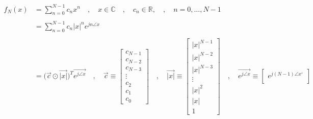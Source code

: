 \documentclass{article}
\begin{document}
\begin{align*}
    f_{N}(x)&= \sum^{N - 1}_{n = 0}c_{n}x^{n} \quad , \quad x \in \mathbb{C} \quad , \quad c_n \in \mathbb{R}, \quad , \quad n = 0, ..., N - 1 \\ \\
            &= \sum^{N - 1}_{n = 0}c_{n}|x|^{n}e^{jn\angle{x}} \\ \\
            &= \Big(\vec{c} \odot \vec{|x|}\Big)^{T}\vec{e^{j\angle{x}}} \quad , \quad
                                     \vec{c} \equiv \begin{bmatrix}
                                                        c_{N - 1} \\
                                                        c_{N - 2} \\
                                                        c_{N - 3} \\
                                                        \vdots \\
                                                        c_{2} \\
                                                        c_{1} \\
                                                        c_{0}
                                                      \end{bmatrix} \quad , \quad
                                   \vec{|x|} \equiv \begin{bmatrix}
                                                        |x|^{N - 1} \\
                                                        |x|^{N - 2} \\
                                                        |x|^{N - 3} \\
                                                        \vdots \\
                                                        |x|^{2} \\
                                                        |x| \\
                                                        1
                                                      \end{bmatrix} \quad , \quad
                \vec{e^{j\angle{x}}} \equiv \begin{bmatrix}
                                                e^{j(N - 1)\angle{x}^{\circ}} \\

\end{bmatrix}
\end{align*}
\end{document}
